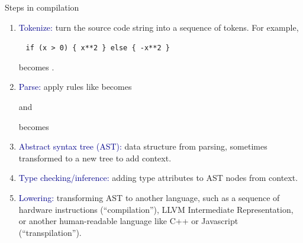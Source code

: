 \documentclass[aspectratio=169]{beamer}
\begin{document}
\begin{frame}{Steps in compilation}
\vspace{0.35 cm}

\begin{enumerate}
\item \textcolor{darkblue}{Tokenize:} turn the source code string into a sequence of tokens. For example,

\vspace{0.15 cm}
\mbox{ } \hfill \texttt{\small if (x > 0) \{ x**2 \} else \{ -x**2 \}} \hfill \mbox{ }

\vspace{0.15 cm}
becomes  \fbox{\texttt{\scriptsize (}}  \fbox{\texttt{\scriptsize >}}  \fbox{\texttt{\scriptsize )}} \fbox{\texttt{\scriptsize \{}}  \fbox{\texttt{\scriptsize **}}  \fbox{\texttt{\scriptsize \}}}  \fbox{\texttt{\scriptsize \{}} \fbox{\texttt{\scriptsize -}}  \fbox{\texttt{\scriptsize **}}  \fbox{\texttt{\scriptsize \}}}.

\item \textcolor{darkblue}{Parse:} apply rules like  \fbox{\texttt{\scriptsize **}}  becomes and

 \fbox{\scriptsize\{}  \fbox{\scriptsize\}}  \fbox{\scriptsize\{}  \fbox{\scriptsize\}} becomes

\item \textcolor{darkblue}{Abstract syntax tree (AST):} data structure from parsing, sometimes transformed to a new tree to add context.

\item \textcolor{darkblue}{Type checking/inference:} adding type attributes to AST nodes from context.

\item \textcolor{darkblue}{Lowering:} transforming AST to another language, such as a sequence of hardware instructions (``compilation''), LLVM Intermediate Representation, or another human-readable language like C++ or Javascript (``transpilation'').
\end{enumerate}
\end{frame}
\end{document}

